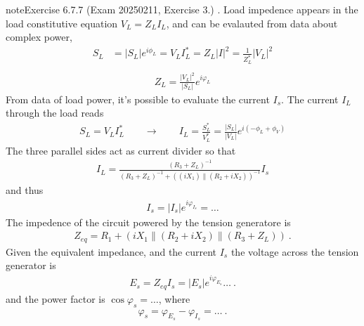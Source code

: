 \documentclass[letterpaper,10pt,english]{jupyterBook}
\begin{document}
\begin{sphinxadmonition}{note}{Exercise 6.7.7 (Exam 2025\sphinxhyphen{}02\sphinxhyphen{}11, Exercise 3.)}
\sphinxAtStartPar
{}. Load impedence appears in the load constitutive equation \(V_L = Z_L I_L\), and can be evalauted from data about complex power,
\begin{equation*}
\begin{split}
   S_L  & = |S_L| e^{i \phi_L} = V_L I_L^* = Z_L |I|^2 = \frac{1}{Z_L^*} |V_L|^2 \\ 
\end{split}
\end{equation*}\begin{equation*}
\begin{split}Z_L = \frac{|V_L|^2}{|S_L|} e^{i \varphi_L}\end{split}
\end{equation*}
\sphinxAtStartPar
{} From data of load power, it’s possible to evaluate the current \(I_s\). The current \(I_L\) through the load reads
\begin{equation*}
\begin{split}S_L = V_L I_L^* \qquad \rightarrow \qquad I_L = \frac{S_L^*}{V_L^*} = \frac{|S_L|}{|V_L|} e^{i(-\phi_L + \phi_V)}\end{split}
\end{equation*}
\sphinxAtStartPar
The three parallel sides act as current divider so that
\begin{equation*}
\begin{split}I_L = \frac{(R_3+Z_L)^{-1}}{(R_3+Z_L)^{-1} + ( (i X_1 ) \parallel (R_2 + i X_2) )^{-1}} I_s\end{split}
\end{equation*}
\sphinxAtStartPar
and thus
\begin{equation*}
\begin{split}I_s = |I_s| e^{i \varphi_{I_s}} = \dots\end{split}
\end{equation*}
\sphinxAtStartPar
{} The impedence of the circuit powered by the tension generatore is
\begin{equation*}
\begin{split}Z_{eq} = R_1 + ( i X_1 \parallel (R_2 + i X_2) \parallel (R_3 + Z_L) ) \ .\end{split}
\end{equation*}
\sphinxAtStartPar
Given the equivalent impedance, and the current \(I_s\) the voltage across the tension generator is
\begin{equation*}
\begin{split}E_s = Z_{eq} I_s = |E_s| e^{i \varphi_{E_s}} \dots \ .\end{split}
\end{equation*}
\sphinxAtStartPar
and the power factor is \(\cos \varphi_s = \dots\), where
\begin{equation*}
\begin{split}\varphi_s = \varphi_{E_s} - \varphi_{I_s} = \dots \ . \end{split}
\end{equation*}\end{sphinxadmonition}
 \label{exercise:exam-25-01-22-exe-02}
\end{document}
